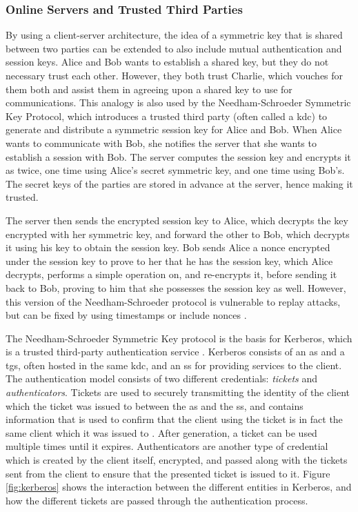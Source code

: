 \subsubsection{Online Servers and Trusted Third Parties}

By using a client-server architecture, the idea of a symmetric key that is shared between two parties can be extended to also include mutual authentication and session keys. Alice and Bob wants to establish a shared key, but they do not necessary trust each other. However, they both trust Charlie, which vouches for them both and assist them in agreeing upon a shared key to use for communications. This analogy is also used by the Needham-Schroeder Symmetric Key Protocol, which introduces a trusted third party (often called a \gls{kdc}) to generate and distribute a symmetric session key for Alice and Bob. When Alice wants to communicate with Bob, she notifies the server that she wants to establish a session with Bob. The server computes the session key and encrypts it as twice, one time using Alice's secret symmetric key, and one time using Bob's. The secret keys of the parties are stored in advance at the server, hence making it trusted.

The server then sends the encrypted session key to Alice, which decrypts the key encrypted with her symmetric key, and forward the other to Bob, which decrypts it using his key to obtain the session key. Bob sends Alice a nonce encrypted under the session key to prove to her that he has the session key, which Alice decrypts, performs a simple operation on, and re-encrypts it, before sending it back to Bob, proving to him that she possesses the session key as well. However, this version of the Needham-Schroeder protocol is vulnerable to replay attacks, but can be fixed by using timestamps or include nonces \cite{needham1987authentication}.

The Needham-Schroeder Symmetric Key protocol is the basis for Kerberos, which is a trusted third-party authentication service \cite{neuman1994kerberos}. Kerberos consists of an \gls{as} and a \gls{tgs}, often hosted in the same \gls{kdc}, and an \gls{ss} for providing services to the client. The authentication model consists of two different credentials: \emph{tickets} and \emph{authenticators}. Tickets are used to securely transmitting the identity of the client which the ticket was issued to between the \gls{as} and the \gls{ss}, and contains information that is used to confirm that the client using the ticket is in fact the same client which it was issued to \cite{steiner1988kerberos}. After generation, a ticket can be used multiple times until it expires. Authenticators are another type of credential which is created by the client itself, encrypted, and passed along with the tickets sent from the client to ensure that the presented ticket is issued to it. Figure \ref{fig:kerberos} shows the interaction between the different entities in Kerberos, and how the different tickets are passed through the authentication process.

